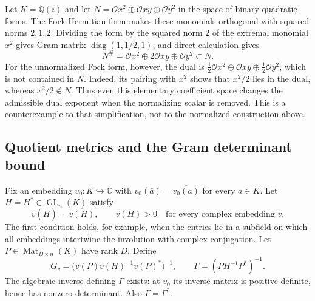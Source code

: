 \begin{example}
Let $K=\mathbb Q(i)$ and let
$N=\mathcal O x^2\oplus\mathcal O xy\oplus\mathcal O y^2$
in the space of binary quadratic forms. The Fock Hermitian form makes
these monomials orthogonal with squared norms $2,1,2$. Dividing the
form by the squared norm $2$ of the extremal monomial $x^2$ gives
Gram matrix $\operatorname{diag}(1,1/2,1)$, and direct calculation gives
\[
 N^\#=\mathcal O x^2\oplus2\mathcal O xy\oplus\mathcal O y^2
                  \subset N.
\]
For the unnormalized Fock form, however, the dual is
$\tfrac12\mathcal O x^2\oplus\mathcal O xy
 \oplus\tfrac12\mathcal O y^2$, which is not contained in $N$.
Indeed, its pairing with $x^2$ shows that $x^2/2$ lies in the dual,
whereas $x^2/2\notin N$.
Thus even this elementary coefficient space changes the admissible
dual exponent when the normalizing scalar is removed. This is a
counterexample to that simplification, not to the normalized
construction above.
\end{example}

\subsection{Quotient metrics and the Gram determinant bound}

Fix an embedding $v_0:K\hookrightarrow\mathbb C$ with
$v_0(\bar a)=\overline{v_0(a)}$ for every $a\in K$.
Let $H=H^*\in\operatorname{GL}_n(K)$ satisfy
\begin{equation}\label{div:H-condition}
 v(\bar H)=\overline{v(H)},\qquad v(H)>0
       \quad\text{for every complex embedding }v.
\end{equation}
The first condition holds, for example, when the entries lie in a
subfield on which all embeddings intertwine the involution with complex
conjugation. Let $P\in\operatorname{Mat}_{D\times n}(K)$ have rank $D$.
Define
\begin{equation}\label{div:quotient-matrices}
 G_v=\bigl(v(P)v(H)^{-1}v(P)^*\bigr)^{-1},\qquad
 \Gamma=(PH^{-1}P^*)^{-1}.
\end{equation}
The algebraic inverse defining $\Gamma$ exists: at $v_0$ its inverse
matrix is positive definite, hence has nonzero determinant. Also
$\Gamma=\Gamma^*$.

